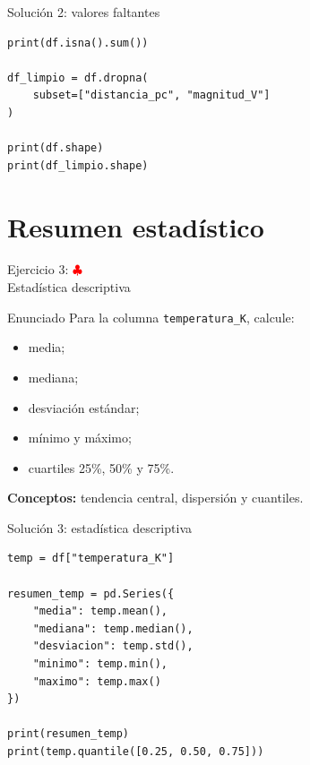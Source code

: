\documentclass[10pt]{beamer}
\begin{document}
\begin{solutionblock}
\begin{frame}[fragile]{Solución 2: valores faltantes}
\begin{verbatim}
print(df.isna().sum())

df_limpio = df.dropna(
    subset=["distancia_pc", "magnitud_V"]
)

print(df.shape)
print(df_limpio.shape)
\end{verbatim}
\end{frame}
\end{solutionblock}

\section{Resumen estadístico}

\begin{frame}{Ejercicio 3: \hfill \textcolor{red}{$\clubsuit$} \\ Estadística descriptiva}
  \begin{block}{Enunciado}
    Para la columna \texttt{temperatura\_K}, calcule:
    \begin{itemize}
      \item media;
      \item mediana;
      \item desviación estándar;
      \item mínimo y máximo;
      \item cuartiles 25\%, 50\% y 75\%.
    \end{itemize}
  \end{block}
  \textbf{Conceptos:} tendencia central, dispersión y cuantiles.
\end{frame}

\begin{solutionblock}
\begin{frame}[fragile,shrink=5]{Solución 3: estadística descriptiva}
\begin{verbatim}
temp = df["temperatura_K"]

resumen_temp = pd.Series({
    "media": temp.mean(),
    "mediana": temp.median(),
    "desviacion": temp.std(),
    "minimo": temp.min(),
    "maximo": temp.max()
})

print(resumen_temp)
print(temp.quantile([0.25, 0.50, 0.75]))
\end{verbatim}
\end{frame}
\end{solutionblock}
\end{document}
